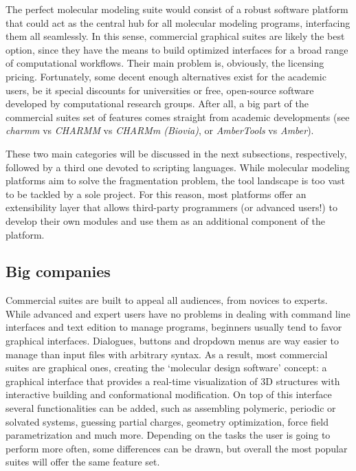 The perfect molecular modeling suite would consist of a robust software platform that could act as the central hub for all molecular modeling programs, interfacing them all seamlessly. In this sense, commercial graphical suites are likely the best option, since they have the means to build optimized interfaces for a broad range of computational workflows. Their main problem is, obviously, the licensing pricing. Fortunately, some decent enough alternatives exist for the academic users, be it special discounts for universities or free, open-source software developed by computational research groups. After all, a big part of the commercial suites set of features comes straight from academic developments (see \textit{charmm} vs \textit{CHARMM} vs \textit{CHARMm (Biovia)}, or \textit{AmberTools} vs \textit{Amber}).

These two main categories will be discussed in the next subsections, respectively, followed by a third one devoted to scripting languages. While molecular modeling platforms aim to solve the fragmentation problem, the tool landscape is too vast to be tackled by a sole project. For this reason, most platforms offer an extensibility layer that allows third-party programmers (or advanced users!) to develop their own modules and use them as an additional component of the platform.

\subsection{Big companies}
Commercial suites are built to appeal all audiences, from novices to experts. While advanced and expert users have no problems in dealing with command line interfaces and text edition to manage programs, beginners usually tend to favor graphical interfaces. Dialogues, buttons and dropdown menus are way easier to manage than input files with arbitrary syntax. As a result, most commercial suites are graphical ones, creating the ‘molecular design software’ concept: a graphical interface that provides a real-time visualization of 3D structures with interactive building and conformational modification. On top of this interface several functionalities can be added, such as assembling polymeric, periodic or solvated systems, guessing partial charges, geometry optimization, force field parametrization and much more. Depending on the tasks the user is going to perform more often, some differences can be drawn, but overall the most popular suites will offer the same feature set.

